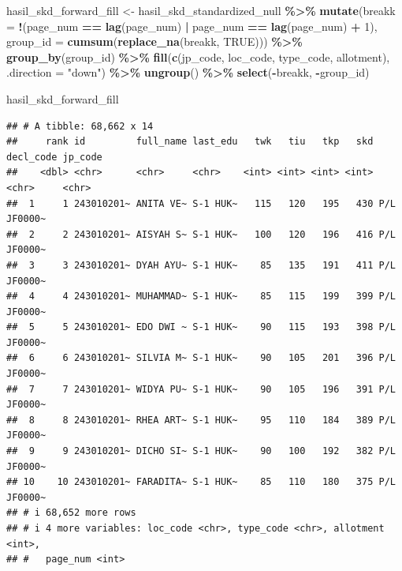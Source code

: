 \documentclass[
]{article}
\newenvironment{Shaded}{\begin{snugshade}}{\end{snugshade}}
\newcommand{\AttributeTok}[1]{\textcolor[rgb]{0.13,0.29,0.53}{#1}}
\newcommand{\ConstantTok}[1]{\textcolor[rgb]{0.56,0.35,0.01}{#1}}
\newcommand{\DecValTok}[1]{\textcolor[rgb]{0.00,0.00,0.81}{#1}}
\newcommand{\FunctionTok}[1]{\textcolor[rgb]{0.13,0.29,0.53}{\textbf{#1}}}
\newcommand{\NormalTok}[1]{#1}
\newcommand{\OtherTok}[1]{\textcolor[rgb]{0.56,0.35,0.01}{#1}}
\newcommand{\SpecialCharTok}[1]{\textcolor[rgb]{0.81,0.36,0.00}{\textbf{#1}}}
\newcommand{\StringTok}[1]{\textcolor[rgb]{0.31,0.60,0.02}{#1}}
\begin{document}
\begin{Shaded}
\begin{Highlighting}[]
\NormalTok{hasil\_skd\_forward\_fill }\OtherTok{\textless{}{-}}\NormalTok{ hasil\_skd\_standardized\_null }\SpecialCharTok{\%\textgreater{}\%} 
  \FunctionTok{mutate}\NormalTok{(}\AttributeTok{breakk =} \SpecialCharTok{!}\NormalTok{(page\_num }\SpecialCharTok{==} \FunctionTok{lag}\NormalTok{(page\_num) }\SpecialCharTok{|}\NormalTok{ page\_num }\SpecialCharTok{==} \FunctionTok{lag}\NormalTok{(page\_num) }\SpecialCharTok{+} \DecValTok{1}\NormalTok{),}
         \AttributeTok{group\_id =} \FunctionTok{cumsum}\NormalTok{(}\FunctionTok{replace\_na}\NormalTok{(breakk, }\ConstantTok{TRUE}\NormalTok{))) }\SpecialCharTok{\%\textgreater{}\%}
  \FunctionTok{group\_by}\NormalTok{(group\_id) }\SpecialCharTok{\%\textgreater{}\%} 
  \FunctionTok{fill}\NormalTok{(}\FunctionTok{c}\NormalTok{(jp\_code, loc\_code, type\_code, allotment), }\AttributeTok{.direction =} \StringTok{"down"}\NormalTok{) }\SpecialCharTok{\%\textgreater{}\%} 
  \FunctionTok{ungroup}\NormalTok{() }\SpecialCharTok{\%\textgreater{}\%} 
  \FunctionTok{select}\NormalTok{(}\SpecialCharTok{{-}}\NormalTok{breakk, }\SpecialCharTok{{-}}\NormalTok{group\_id)}

\NormalTok{hasil\_skd\_forward\_fill}
\end{Highlighting}
\end{Shaded}

\begin{verbatim}
## # A tibble: 68,662 x 14
##     rank id         full_name last_edu   twk   tiu   tkp   skd decl_code jp_code
##    <dbl> <chr>      <chr>     <chr>    <int> <int> <int> <int> <chr>     <chr>  
##  1     1 243010201~ ANITA VE~ S-1 HUK~   115   120   195   430 P/L       JF0000~
##  2     2 243010201~ AISYAH S~ S-1 HUK~   100   120   196   416 P/L       JF0000~
##  3     3 243010201~ DYAH AYU~ S-1 HUK~    85   135   191   411 P/L       JF0000~
##  4     4 243010201~ MUHAMMAD~ S-1 HUK~    85   115   199   399 P/L       JF0000~
##  5     5 243010201~ EDO DWI ~ S-1 HUK~    90   115   193   398 P/L       JF0000~
##  6     6 243010201~ SILVIA M~ S-1 HUK~    90   105   201   396 P/L       JF0000~
##  7     7 243010201~ WIDYA PU~ S-1 HUK~    90   105   196   391 P/L       JF0000~
##  8     8 243010201~ RHEA ART~ S-1 HUK~    95   110   184   389 P/L       JF0000~
##  9     9 243010201~ DICHO SI~ S-1 HUK~    90   100   192   382 P/L       JF0000~
## 10    10 243010201~ FARADITA~ S-1 HUK~    85   110   180   375 P/L       JF0000~
## # i 68,652 more rows
## # i 4 more variables: loc_code <chr>, type_code <chr>, allotment <int>,
## #   page_num <int>
\end{verbatim}
\end{document}
